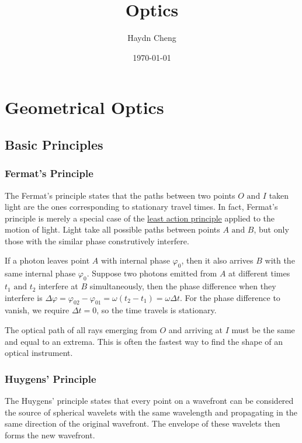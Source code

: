 \documentclass[english,a4paper,12pt]{report}
\title{Optics}
\author{Haydn Cheng}
\date{\today}
\begin{document}
\maketitle
\tableofcontents
    
\chapter{Geometrical Optics}

\section{Basic Principles}

\subsection{Fermat's Principle}

The Fermat's principle states that the paths between two points \(O \text { and } I\) taken light are the ones corresponding to stationary travel times. In fact, Fermat's principle is merely a special case of the \href{https:////www.youtube.com//watch?v=Q10_srZ-pbs}{least action principle} applied to the motion of light. Light take all possible paths between points \(A \text { and } B\), but only those with the similar phase construtively interfere.

If a photon leaves point \(A\) with internal phase \(\varphi _{0} \), then it also arrives \(B\) with the same internal phase \(\varphi _{0} \). Suppose two photons emitted from \(A\) at different times \(t_1 \text { and } t_2 \) interfere at \(B\) simultaneously, then the phase difference when they interfere is \(\Delta \varphi = \varphi _{02}- \varphi _{01}  = \omega (t_2 -t_1 ) = \omega \Delta t\). For the phase difference to vanish, we require \(\Delta t = 0\), so the time travels is stationary.

The optical path of all rays emerging from \(O\) and arriving at \(I\) must be the same and equal to an extrema. This is often the fastest way to find the shape of an optical instrument.

\subsection{Huygens' Principle}

The Huygens' principle states that every point on a wavefront can be considered the source of spherical wavelets with the same wavelength and propagating in the same direction of the original wavefront. The envelope of these wavelets then forms the new wavefront. 
\end{document}
